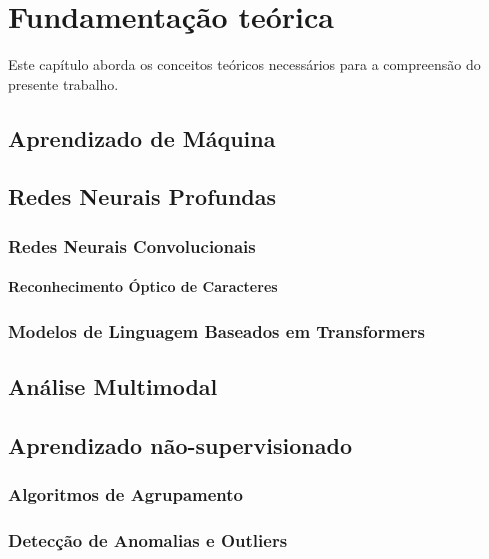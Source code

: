 \chapter{Fundamentação teórica}

Este capítulo aborda os conceitos teóricos necessários para a compreensão do presente trabalho.

\section{Aprendizado de Máquina}


\section{Redes Neurais Profundas}

\subsection{Redes Neurais Convolucionais}

\subsubsection{Reconhecimento Óptico de Caracteres}

\subsection{Modelos de Linguagem Baseados em Transformers}

\section{Análise Multimodal}

\section{Aprendizado não-supervisionado}

\subsection{Algoritmos de Agrupamento}


\subsection{Detecção de Anomalias e Outliers}

